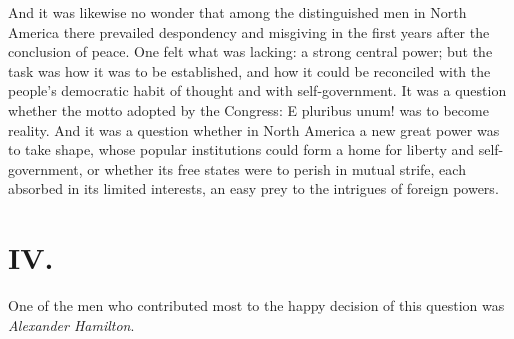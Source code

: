 \documentclass[12pt,a4paper,openany]{book}
\begin{document}
And it was likewise no wonder that among the
distinguished men in North America there prevailed despondency and
misgiving in the first years after the conclusion of peace. One felt
what was lacking: a strong central power; but the task was
how it was to be established, and how it could be
reconciled with the people's democratic habit of thought and with
self-government. It was a question whether the motto adopted by the Congress:
E pluribus unum! was to become reality. And
it was a question whether in North America a new great
power was to take shape, whose popular institutions could form a home
for liberty and self-government, or whether its free states were to
perish in mutual strife, each absorbed in its limited
interests, an easy prey to the intrigues of foreign powers.

\section*{IV.}

One of the men who contributed most to the
happy decision of this question was \emph{Alexander Hamilton}.
\end{document}
